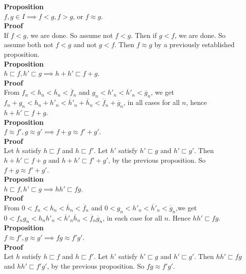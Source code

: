 \documentclass{article}
\newcommand{\zeqs}{ I}
\newcommand{\of}{ \overline f}
\newcommand{\og}{ \overline g}
\newcommand{\oh}{ \overline h}
\newcommand{\forks}{ \sqsubset}
\begin{document}
\textbf{Proposition}\\
$f,g \in \zeqs \implies f<g, f>g$, or $f \approx g$.\\

\textbf{Proof}\\
If $f < g$, we are done. So assume not $f < g$. Then if $g < f$, we are done. So assume both not $f < g$ and not $g < f$. Then $f \approx g$ by a previously established proposition.\\


\textbf{Proposition}\\
$h \forks f, h' \forks g \implies h + h' \forks f + g$.\\

\textbf{Proof}\\
From $f_n < h_n < \oh_n < \of_n$ and $g_n < h'_n < \oh'_n < \og_n$, we get $f_n + g_n < h_n + h'_n < \oh'_n + \oh_n <  \of_n  + \og_n$, in all cases for all $n$, hence $h + h' \forks f + g$.\\

\textbf{Proposition}\\
$f \approx f', g \approx g' \implies f + g \approx f' + g'$.\\

\textbf{Proof}\\
Let $h$ satisfy $h \forks f$ and $h \forks f'$. Let $h'$ satisfy $h' \forks g$ and $h' \forks g'$. Then  $h + h' \forks f + g$ and $h + h' \forks f' + g'$, by the previous proposition. So $f + g \approx f' + g'$.\\

\textbf{Proposition}\\
$h \forks f, h' \forks g \implies hh' \forks fg$.\\

\textbf{Proof}\\
From $0 < f_n < h_n < \oh_n < \of_n$ and $0 < g_n < h'_n < \oh'_n < \og_n$,we get $ 0 < f_n g_n < h_n h'_n < \oh'_n \oh_n < \of_n \og_n$, in each case for all $n$. Hence $hh' \forks fg$.\\

\textbf{Proposition}\\
$f \approx f', g \approx g' \implies fg \approx f'g'$.\\

\textbf{Proof}\\
Let $h$ satisfy $h \forks f$ and $h \forks f'$. Let $h'$ satisfy $h' \forks g$ and $h' \forks g'$. Then  $hh' \forks fg$ and $hh' \forks f'g'$, by the previous proposition. So $fg \approx f'g'$.\\
\end{document}
